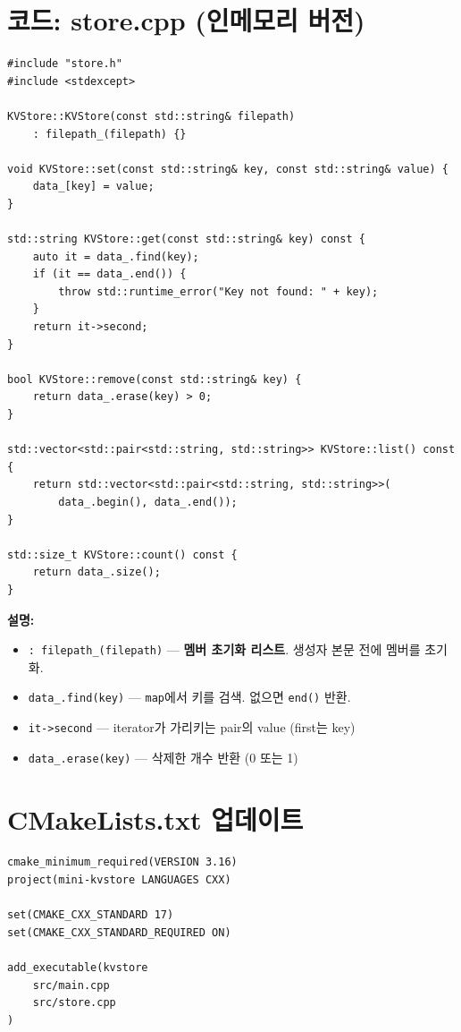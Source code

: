 \documentclass[11pt,a4paper]{book}
\newcommand{\file}[1]{\texttt{#1}}
\newcommand{\code}[1]{\texttt{#1}}
\begin{document}
\section{코드: store.cpp (인메모리 버전)}

\begin{lstlisting}[style=cpp,title={\file{src/store.cpp}}]
#include "store.h"
#include <stdexcept>

KVStore::KVStore(const std::string& filepath)
    : filepath_(filepath) {}

void KVStore::set(const std::string& key, const std::string& value) {
    data_[key] = value;
}

std::string KVStore::get(const std::string& key) const {
    auto it = data_.find(key);
    if (it == data_.end()) {
        throw std::runtime_error("Key not found: " + key);
    }
    return it->second;
}

bool KVStore::remove(const std::string& key) {
    return data_.erase(key) > 0;
}

std::vector<std::pair<std::string, std::string>> KVStore::list() const {
    return std::vector<std::pair<std::string, std::string>>(
        data_.begin(), data_.end());
}

std::size_t KVStore::count() const {
    return data_.size();
}
\end{lstlisting}

\textbf{설명:}
\begin{itemize}[nosep]
\item \code{: filepath\_(filepath)} — \textbf{멤버 초기화 리스트}. 생성자 본문 전에 멤버를 초기화.
\item \code{data\_.find(key)} — \code{map}에서 키를 검색. 없으면 \code{end()} 반환.
\item \code{it->second} — iterator가 가리키는 pair의 value (first는 key)
\item \code{data\_.erase(key)} — 삭제한 개수 반환 (0 또는 1)
\end{itemize}

\section{CMakeLists.txt 업데이트}

\begin{lstlisting}[style=cmake,title={\file{CMakeLists.txt} (업데이트)}]
cmake_minimum_required(VERSION 3.16)
project(mini-kvstore LANGUAGES CXX)

set(CMAKE_CXX_STANDARD 17)
set(CMAKE_CXX_STANDARD_REQUIRED ON)

add_executable(kvstore
    src/main.cpp
    src/store.cpp
)
\end{lstlisting}
\end{document}

